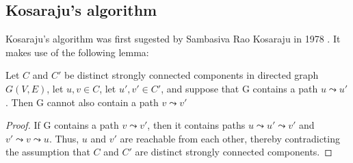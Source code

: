 \subsection{Kosaraju's algorithm} \label{algorithm-scc-kosaraju}
Kosaraju's algorithm was first sugested by Sambasiva Rao Kosaraju in 1978 \cite{intro-alg}. It makes use of the following lemma:
\begin{lemma} \label{lem:kosaraju1}
    Let $C$ and $C'$ be distinct strongly connected components in directed graph $G(V,E)$, let $u,v \in C$, let $u',v' \in C'$, and suppose that G contains a path $u \leadsto u'$. Then G cannot also contain a path $v \leadsto v'$
\end{lemma}
\begin{proof}
    If G contains a path $v \leadsto v'$, then it contains paths $u \leadsto u' \leadsto v'$ and $v' \leadsto v \leadsto u$. Thus, $u$ and $v'$ are reachable from each other, thereby contradicting the assumption that $C$ and $C'$ are distinct strongly connected components.
\end{proof}

